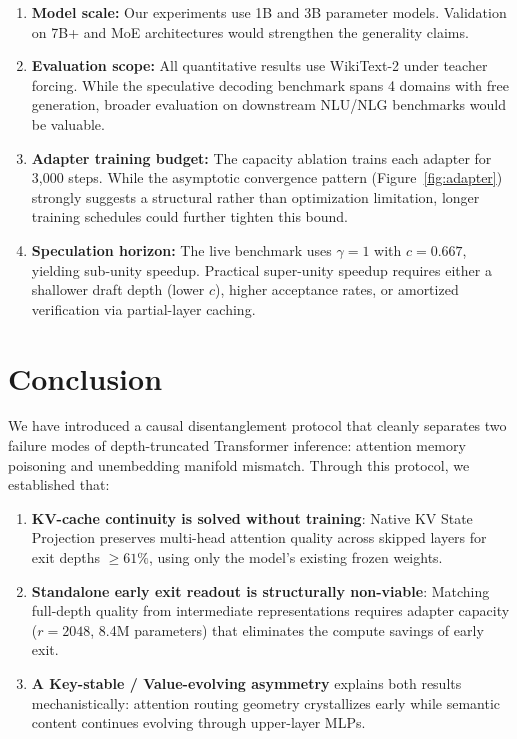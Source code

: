 \documentclass{article}
\begin{document}
\begin{enumerate}[nosep,leftmargin=*]
    \item \textbf{Model scale:} Our experiments use 1B and 3B parameter models. Validation on 7B+ and MoE architectures would strengthen the generality claims.
    
    \item \textbf{Evaluation scope:} All quantitative results use WikiText-2 under teacher forcing. While the speculative decoding benchmark spans 4 domains with free generation, broader evaluation on downstream NLU/NLG benchmarks would be valuable.
    
    \item \textbf{Adapter training budget:} The capacity ablation trains each adapter for 3{,}000 steps. While the asymptotic convergence pattern (Figure~\ref{fig:adapter}) strongly suggests a structural rather than optimization limitation, longer training schedules could further tighten this bound.
    
    \item \textbf{Speculation horizon:} The live benchmark uses $\gamma{=}1$ with $c{=}0.667$, yielding sub-unity speedup. Practical super-unity speedup requires either a shallower draft depth (lower $c$), higher acceptance rates, or amortized verification via partial-layer caching.
\end{enumerate}

\section{Conclusion}

We have introduced a causal disentanglement protocol that cleanly separates two failure modes of depth-truncated Transformer inference: attention memory poisoning and unembedding manifold mismatch. Through this protocol, we established that:

\begin{enumerate}[nosep,leftmargin=*]
    \item \textbf{KV-cache continuity is solved without training}: Native KV State Projection preserves multi-head attention quality across skipped layers for exit depths $\ge 61\%$, using only the model's existing frozen weights.
    
    \item \textbf{Standalone early exit readout is structurally non-viable}: Matching full-depth quality from intermediate representations requires adapter capacity ($r{=}2048$, 8.4M parameters) that eliminates the compute savings of early exit.
    
    \item \textbf{A Key-stable / Value-evolving asymmetry} explains both results mechanistically: attention routing geometry crystallizes early while semantic content continues evolving through upper-layer MLPs.
\end{enumerate}
\end{document}
